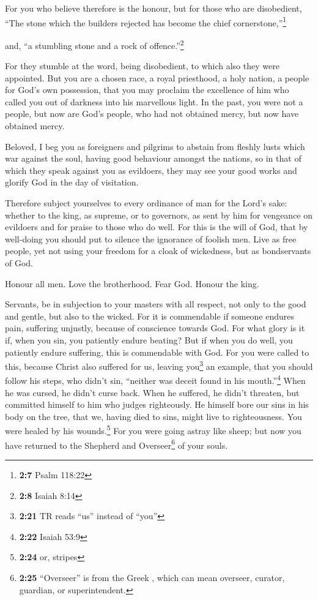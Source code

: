  For you who believe therefore is the honour, but for
those who are disobedient, ``The stone which the builders rejected has
become the chief cornerstone,''\footnote{\textbf{2:7} Psalm 118:22}

 and, ``a stumbling stone and a rock of
offence.''\footnote{\textbf{2:8} Isaiah 8:14}

For they stumble at the word, being disobedient, to which also they were
appointed.  But you are a chosen race, a royal priesthood,
a holy nation, a people for God's own possession, that you may proclaim
the excellence of him who called you out of darkness into his marvellous
light.  In the past, you were not a people, but now are
God's people, who had not obtained mercy, but now have obtained mercy.

 Beloved, I beg you as foreigners and pilgrims to abstain
from fleshly lusts which war against the soul,  having
good behaviour amongst the nations, so in that of which they speak
against you as evildoers, they may see your good works and glorify God
in the day of visitation.

 Therefore subject yourselves to every ordinance of man
for the Lord's sake: whether to the king, as supreme,  or
to governors, as sent by him for vengeance on evildoers and for praise
to those who do well.  For this is the will of God, that
by well-doing you should put to silence the ignorance of foolish men.
 Live as free people, yet not using your freedom for a
cloak of wickedness, but as bondservants of God.

 Honour all men. Love the brotherhood. Fear God. Honour
the king.

 Servants, be in subjection to your masters with all
respect, not only to the good and gentle, but also to the wicked.
 For it is commendable if someone endures pain, suffering
unjustly, because of conscience towards God.  For what
glory is it if, when you sin, you patiently endure beating? But if when
you do well, you patiently endure suffering, this is commendable with
God.  For you were called to this, because Christ also
suffered for us, leaving you\footnote{\textbf{2:21} TR reads ``us''
  instead of ``you''} an example, that you should follow his steps,
 who didn't sin, ``neither was deceit found in his
mouth.''\footnote{\textbf{2:22} Isaiah 53:9}  When he was
cursed, he didn't curse back. When he suffered, he didn't threaten, but
committed himself to him who judges righteously.  He
himself bore our sins in his body on the tree, that we, having died to
sins, might live to righteousness. You were healed by his
wounds.\footnote{\textbf{2:24} or, stripes}  For you were
going astray like sheep; but now you have returned to the Shepherd and
Overseer\footnote{\textbf{2:25} ``Overseer'' is from the Greek
  , which can mean overseer, curator, guardian, or
  superintendent.} of your souls.


